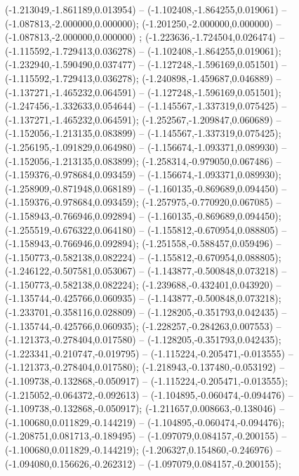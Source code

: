  (-1.213049,-1.861189,0.013954) -- (-1.102408,-1.864255,0.019061) -- (-1.087813,-2.000000,0.000000);
 (-1.201250,-2.000000,0.000000) -- (-1.087813,-2.000000,0.000000) ;
 (-1.223636,-1.724504,0.026474) -- (-1.115592,-1.729413,0.036278) -- (-1.102408,-1.864255,0.019061);
 (-1.232940,-1.590490,0.037477) -- (-1.127248,-1.596169,0.051501) -- (-1.115592,-1.729413,0.036278);
 (-1.240898,-1.459687,0.046889) -- (-1.137271,-1.465232,0.064591) -- (-1.127248,-1.596169,0.051501);
 (-1.247456,-1.332633,0.054644) -- (-1.145567,-1.337319,0.075425) -- (-1.137271,-1.465232,0.064591);
 (-1.252567,-1.209847,0.060689) -- (-1.152056,-1.213135,0.083899) -- (-1.145567,-1.337319,0.075425);
 (-1.256195,-1.091829,0.064980) -- (-1.156674,-1.093371,0.089930) -- (-1.152056,-1.213135,0.083899);
 (-1.258314,-0.979050,0.067486) -- (-1.159376,-0.978684,0.093459) -- (-1.156674,-1.093371,0.089930);
 (-1.258909,-0.871948,0.068189) -- (-1.160135,-0.869689,0.094450) -- (-1.159376,-0.978684,0.093459);
 (-1.257975,-0.770920,0.067085) -- (-1.158943,-0.766946,0.092894) -- (-1.160135,-0.869689,0.094450);
 (-1.255519,-0.676322,0.064180) -- (-1.155812,-0.670954,0.088805) -- (-1.158943,-0.766946,0.092894);
 (-1.251558,-0.588457,0.059496) -- (-1.150773,-0.582138,0.082224) -- (-1.155812,-0.670954,0.088805);
 (-1.246122,-0.507581,0.053067) -- (-1.143877,-0.500848,0.073218) -- (-1.150773,-0.582138,0.082224);
 (-1.239688,-0.432401,0.043920) -- (-1.135744,-0.425766,0.060935) -- (-1.143877,-0.500848,0.073218);
 (-1.233701,-0.358116,0.028809) -- (-1.128205,-0.351793,0.042435) -- (-1.135744,-0.425766,0.060935);
 (-1.228257,-0.284263,0.007553) -- (-1.121373,-0.278404,0.017580) -- (-1.128205,-0.351793,0.042435);
 (-1.223341,-0.210747,-0.019795) -- (-1.115224,-0.205471,-0.013555) -- (-1.121373,-0.278404,0.017580);
 (-1.218943,-0.137480,-0.053192) -- (-1.109738,-0.132868,-0.050917) -- (-1.115224,-0.205471,-0.013555);
 (-1.215052,-0.064372,-0.092613) -- (-1.104895,-0.060474,-0.094476) -- (-1.109738,-0.132868,-0.050917);
 (-1.211657,0.008663,-0.138046) -- (-1.100680,0.011829,-0.144219) -- (-1.104895,-0.060474,-0.094476);
 (-1.208751,0.081713,-0.189495) -- (-1.097079,0.084157,-0.200155) -- (-1.100680,0.011829,-0.144219);
 (-1.206327,0.154860,-0.246976) -- (-1.094080,0.156626,-0.262312) -- (-1.097079,0.084157,-0.200155);
